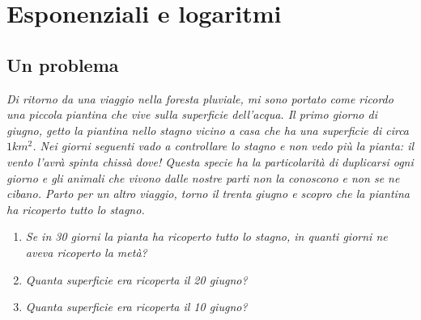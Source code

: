 


\chapter[Esponenziali e logaritmi]{Esponenziali e logaritmi}

\section{Un problema}
\label{sec:esplog_problemi}

\emph{
Di ritorno da una viaggio nella foresta pluviale, mi sono portato come ricordo 
una piccola piantina che vive sulla superficie dell'acqua. 
Il primo giorno di giugno, getto la piantina nello stagno vicino a casa che ha 
una superficie di circa \(1km^2\).
Nei giorni seguenti vado a controllare lo stagno e non vedo più la pianta: il 
vento l'avrà spinta chissà dove! 
Questa specie ha la particolarità di duplicarsi ogni giorno e gli animali che 
vivono dalle nostre parti non la conoscono e non se ne cibano.
Parto per un altro viaggio, torno il trenta giugno e scopro che la piantina 
ha ricoperto tutto lo stagno.}

\begin{enumerate}
 \item
\emph{Se in 30 giorni la pianta ha ricoperto tutto lo stagno, in quanti giorni 
ne aveva ricoperto la metà?}
 \item 
\emph{Quanta superficie era ricoperta il 20 giugno?}
 \item 
\emph{Quanta superficie era ricoperta il 10 giugno?}
\end{enumerate}

